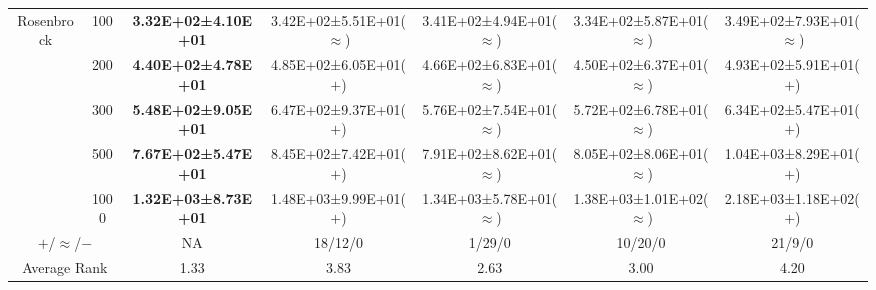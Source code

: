 \begin{tabular}{|cc|c|c|c|c|c|}
\multicolumn{1}{|c|}{\multirow{5}{*}{Rosenbrock}} & 100       & \textbf{3.32E+02±4.10E+01} & 3.42E+02±5.51E+01($\approx$)          & 3.41E+02±4.94E+01($\approx$) & 3.34E+02±5.87E+01($\approx$)          & 3.49E+02±7.93E+01($\approx$)          \\ \cline{2-7} 
\multicolumn{1}{|c|}{}                            & 200       & \textbf{4.40E+02±4.78E+01} & 4.85E+02±6.05E+01($+$)                & 4.66E+02±6.83E+01($\approx$) & 4.50E+02±6.37E+01($\approx$)          & 4.93E+02±5.91E+01($+$)                \\ \cline{2-7} 
\multicolumn{1}{|c|}{}                            & 300       & \textbf{5.48E+02±9.05E+01} & 6.47E+02±9.37E+01($+$)                & 5.76E+02±7.54E+01($\approx$) & 5.72E+02±6.78E+01($\approx$)          & 6.34E+02±5.47E+01($+$)                \\ \cline{2-7} 
\multicolumn{1}{|c|}{}                            & 500       & \textbf{7.67E+02±5.47E+01} & 8.45E+02±7.42E+01($+$)                & 7.91E+02±8.62E+01($\approx$) & 8.05E+02±8.06E+01($\approx$)          & 1.04E+03±8.29E+01($+$)                \\ \cline{2-7} 
\multicolumn{1}{|c|}{}                            & 1000      & \textbf{1.32E+03±8.73E+01} & 1.48E+03±9.99E+01($+$)                & 1.34E+03±5.78E+01($\approx$) & 1.38E+03±1.01E+02($\approx$)          & 2.18E+03±1.18E+02($+$)                \\ \hline
\multicolumn{2}{|c|}{$+$/$\approx$/$-$}                       & NA                         & 18/12/0                               & 1/29/0                       & 10/20/0                               & 21/9/0                                \\ \hline
\multicolumn{2}{|c|}{Average Rank}                            & 1.33                       & 3.83                                  & 2.63                         & 3.00                                  & 4.20                                  \\ \hline
\end{tabular}
